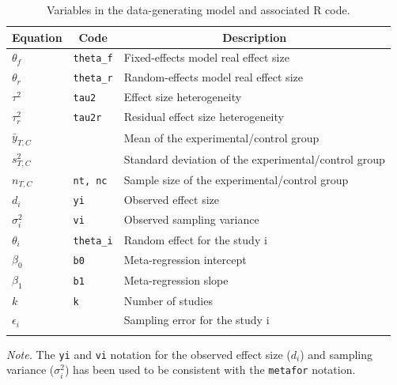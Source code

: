 \documentclass[
  man,floatsintext]{apa6}
\begin{document}
\normalsize

\scriptsize

\begin{table}[H]

\begin{center}
\begin{threeparttable}

\caption{\label{tab:notation-tab}Variables in the data-generating model and associated R code.}

\begin{tabular}{lll}
\toprule
Equation & \multicolumn{1}{c}{Code} & \multicolumn{1}{c}{Description}\\
\midrule
$\theta_f$ & \texttt{theta\_f} & Fixed-effects model real effect size\\
$\theta_r$ & \texttt{theta\_r} & Random-effects model real effect size\\
$\tau^2$ & \texttt{tau2} & Effect size heterogeneity\\
$\tau^2_r$ & \texttt{tau2r} & Residual effect size heterogeneity\\
$\bar y_{T, C}$ & \texttt{} & Mean of the experimental/control group\\
$s^2_{T, C}$ & \texttt{} & Standard deviation of the experimental/control group\\
$n_{T, C}$ & \texttt{nt, nc} & Sample size of the experimental/control group\\
$d_i$ & \texttt{yi} & Observed effect size\\
$\sigma^2_i$ & \texttt{vi} & Observed sampling variance\\
$\theta_i$ & \texttt{theta\_i} & Random effect for the study i\\
$\beta_0$ & \texttt{b0} & Meta-regression intercept\\
$\beta_1$ & \texttt{b1} & Meta-regression slope\\
$k$ & \texttt{k} & Number of studies\\
$\epsilon_i$ & \texttt{} & Sampling error for the study i\\
\bottomrule
\addlinespace
\end{tabular}

\begin{tablenotes}[para]
\normalsize{\textit{Note.} The \texttt{yi} and \texttt{vi} notation for the observed effect size ($d_i$) and sampling variance ($\sigma^2_i$) has been used to be consistent with the \texttt{metafor} notation.}
\end{tablenotes}

\end{threeparttable}
\end{center}

\end{table}
\end{document}
